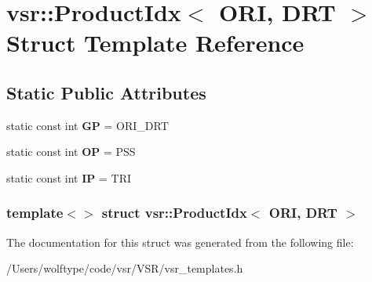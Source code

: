 \hypertarget{structvsr_1_1_product_idx_3_01_o_r_i_00_01_d_r_t_01_4}{\section{vsr\-:\-:Product\-Idx$<$ O\-R\-I, D\-R\-T $>$ Struct Template Reference}
\label{structvsr_1_1_product_idx_3_01_o_r_i_00_01_d_r_t_01_4}
}
\subsection*{Static Public Attributes}
\begin{DoxyCompactItemize}
\item 
\hypertarget{structvsr_1_1_product_idx_3_01_o_r_i_00_01_d_r_t_01_4_a6a0f11fa8816a2caa0ce23be52b9850c}{static const int {\bfseries G\-P} = O\-R\-I\-\_\-\-D\-R\-T}\label{structvsr_1_1_product_idx_3_01_o_r_i_00_01_d_r_t_01_4_a6a0f11fa8816a2caa0ce23be52b9850c}

\item 
\hypertarget{structvsr_1_1_product_idx_3_01_o_r_i_00_01_d_r_t_01_4_a40c147dab98858d800a54a5c28be1f5b}{static const int {\bfseries O\-P} = P\-S\-S}\label{structvsr_1_1_product_idx_3_01_o_r_i_00_01_d_r_t_01_4_a40c147dab98858d800a54a5c28be1f5b}

\item 
\hypertarget{structvsr_1_1_product_idx_3_01_o_r_i_00_01_d_r_t_01_4_a0d32d2d2b972adf29e9a66968ca03efe}{static const int {\bfseries I\-P} = T\-R\-I}\label{structvsr_1_1_product_idx_3_01_o_r_i_00_01_d_r_t_01_4_a0d32d2d2b972adf29e9a66968ca03efe}

\end{DoxyCompactItemize}
\subsubsection*{template$<$$>$ struct vsr\-::\-Product\-Idx$<$ O\-R\-I, D\-R\-T $>$}



The documentation for this struct was generated from the following file\-:\begin{DoxyCompactItemize}
\item 
/\-Users/wolftype/code/vsr/\-V\-S\-R/vsr\-\_\-templates.\-h\end{DoxyCompactItemize}
